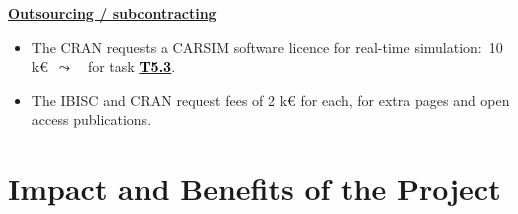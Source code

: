 \documentclass[a4paper,11pt]{article}
\begin{document}
\noindent
\underline{\textbf{Outsourcing / subcontracting}} 
\begin{itemize}[leftmargin=.25in,noitemsep,nolistsep]
\item The CRAN requests a CARSIM software licence for real-time simulation:~10 k{\euro}~$\leadsto$~~for task \underline{\bf \textcolor{black}{T5.3}}.
\item The IBISC and CRAN request fees of 2 k{\euro} for each, for extra pages and open access publications.
\end{itemize}









\section{Impact and Benefits of the Project}
%
%
\vspace{-0.3cm}
\end{document}
